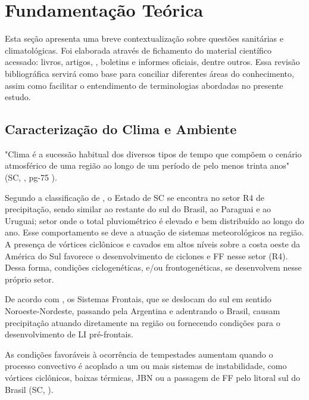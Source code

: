 \chapter{Fundamentação Teórica}

Esta seção apresenta uma breve contextualização sobre questões sanitárias e climatológicas. Foi elaborada através de  fichamento do material científico acessado: livros, artigos, , boletins e informes oficiais, dentre outros. Essa revisão bibliográfica servirá como base para conciliar diferentes áreas do conhecimento, assim como facilitar o entendimento de terminologias abordadas no presente estudo.

\section{Caracterização do Clima e Ambiente}



\indent "Clima é a sucessão habitual dos diversos tipos de tempo que compõem o cenário atmosférico de uma região ao longo de um período de pelo menos trinta anos" (\acrlong{SC}, \citeyear{AtlasSCnatureza}, pg-75 ).

\indent Segundo a classificação de ,  o Estado de \acrlong{SC} se encontra no setor R4 de precipitação, sendo similar ao restante do sul do Brasil, ao Paraguai e ao Uruguai; setor onde o total pluviométrico é elevado e bem distribuído ao longo do ano. Esse comportamento se deve a atuação de sistemas meteorológicos na região. A presença de vórtices ciclônicos e cavados em altos níveis sobre a costa oeste da América do Sul favorece o desenvolvimento de ciclones e \acrlong{FF} nesse setor (R4). Dessa forma, condições ciclogenéticas, e/ou frontogenéticas, se desenvolvem nesse próprio setor.

\indent De acordo com  , os Sistemas Frontais, que se deslocam do sul em sentido Noroeste-Nordeste, passando pela Argentina e adentrando o Brasil, causam precipitação atuando diretamente na região ou fornecendo condições para o desenvolvimento
de \acrfull{LI} pré-frontais.

\indent As condições favoráveis à ocorrência de tempestades aumentam quando o processo convectivo é acoplado a um ou mais sistemas de instabilidade, como vórtices ciclônicos, baixas térmicas, \acrfull{JBN} ou a passagem de \acrlong{FF} pelo litoral sul do Brasil (\acrlong{SC}, \citeyear{AtlasSCnatureza}).

